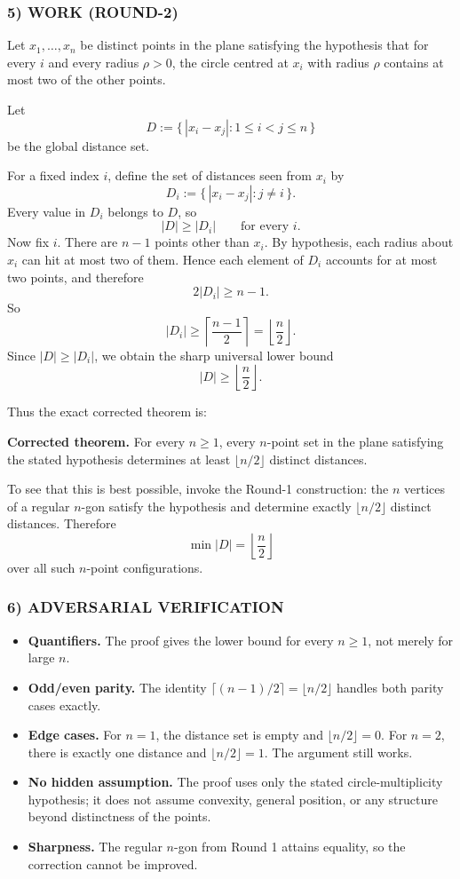 \subsubsection*{5) WORK (ROUND-2)}
Let $x_1,\dots,x_n$ be distinct points in the plane satisfying the hypothesis that for every $i$ and every radius $\rho>0$, the circle centred at $x_i$ with radius $\rho$ contains at most two of the other points.

Let
\[
D:=\{\,|x_i-x_j|:1\leq i<j\leq n\,\}
\]
be the global distance set.

For a fixed index $i$, define the set of distances seen from $x_i$ by
\[
D_i:=\{\,|x_i-x_j|:j\neq i\,\}.
\]
Every value in $D_i$ belongs to $D$, so
\[
|D|\geq |D_i| \qquad \text{for every } i.
\]
Now fix $i$. There are $n-1$ points other than $x_i$. By hypothesis, each radius about $x_i$ can hit at most two of them. Hence each element of $D_i$ accounts for at most two points, and therefore
\[
2|D_i|\geq n-1.
\]
So
\[
|D_i|\geq \left\lceil\frac{n-1}{2}\right\rceil = \left\lfloor\frac n2\right\rfloor.
\]
Since $|D|\ge |D_i|$, we obtain the sharp universal lower bound
\[
|D|\geq \left\lfloor\frac n2\right\rfloor.
\]

Thus the exact corrected theorem is:

\medskip
\noindent\textbf{Corrected theorem.}
For every $n\ge 1$, every $n$-point set in the plane satisfying the stated hypothesis determines at least $\lfloor n/2\rfloor$ distinct distances.

\medskip
To see that this is best possible, invoke the Round-1 construction: the $n$ vertices of a regular $n$-gon satisfy the hypothesis and determine exactly $\lfloor n/2\rfloor$ distinct distances. Therefore
\[
\min |D| = \left\lfloor\frac n2\right\rfloor
\]
over all such $n$-point configurations.

\subsubsection*{6) ADVERSARIAL VERIFICATION}
\begin{itemize}
\item \textbf{Quantifiers.} The proof gives the lower bound for every $n\ge 1$, not merely for large $n$.
\item \textbf{Odd/even parity.} The identity $\lceil (n-1)/2\rceil=\lfloor n/2\rfloor$ handles both parity cases exactly.
\item \textbf{Edge cases.} For $n=1$, the distance set is empty and $\lfloor n/2\rfloor=0$. For $n=2$, there is exactly one distance and $\lfloor n/2\rfloor=1$. The argument still works.
\item \textbf{No hidden assumption.} The proof uses only the stated circle-multiplicity hypothesis; it does not assume convexity, general position, or any structure beyond distinctness of the points.
\item \textbf{Sharpness.} The regular $n$-gon from Round 1 attains equality, so the correction cannot be improved.
\end{itemize}

